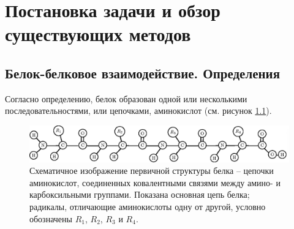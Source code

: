 \graphicspath{{../images/intro/}}
\chapter{Постановка задачи и обзор существующих методов}




\section{Белок-белковое взаимодействие. Определения}



Согласно определению, белок образован одной или несколькими последовательностями, или цепочками, аминокислот (см. рисунок \ref{fig:aa3_1}).

\begin{figure}[h]
%
\includegraphics[width=\linewidth]{aa3_1.eps}
\caption{\small{Схематичное изображение первичной структуры белка -- цепочки аминокислот, соединенных ковалентными связями между амино- и карбоксильными группами. Показана основная цепь белка; радикалы, отличающие аминокислоты одну от другой, условно обозначены $R_1$, $R_2$, $R_3$ и $R_4$. }}
\label{fig:aa3_1}
\end{figure}

